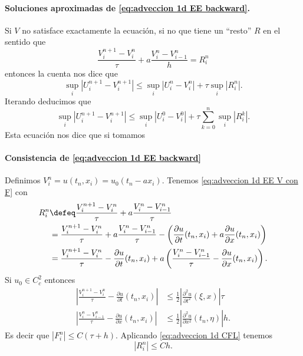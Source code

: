 \paragraph{Soluciones aproximadas de \eqref{eq:adveccion 1d EE backward}.}
Si $V$ no satisface exactamente la ecuación, si no que tiene un ``resto'' $R$ en el sentido que
\begin{equation}
    \label{eq:adveccion 1d EE V con F}
    \frac{V_i^{n+1} - V_i^n}{\tau} + a \frac{V_{i}^{n} - V_{i-1}^n}{h} = R_i^n
\end{equation}
entonces la cuenta nos dice que
\begin{equation*}
    \sup_i |U_i^{n+1} - V_i^{n+1}| \le \sup_i |U_i^n - V_i^n| + \tau \sup_i |R_i^{n}|.
\end{equation*}
Iterando deducimos que
\begin{equation}
    \tag{A-S}
    \label{eq:adveccion 1d dependencia continua}
    \sup_i |U_i^{n+1} - V_i^{n+1}| \le \sup_i |U_i^0 - V_i^0| + \tau \sum_{k=0}^n \sup_i |R_i^{k}|.
\end{equation}
Esta ecuación nos dice que si tomamos

\paragraph{Consistencia de \eqref{eq:adveccion 1d EE backward}}

Definimos $V_i^n = u(t_n, x_i) = u_0(t_n - ax_i)$.
Tenemos \eqref{eq:adveccion 1d EE V con F} con
\begin{align*}
    R_i^{n} & \defeq \frac{V_i^{n+1} - V_i^n}{\tau} + a \frac{V_i^{n} - V_{i-1}^n}{\tau}
    \\
            & = \frac{V_i^{n+1} - V_i^n}{\tau} + a \frac{V_i^{n} - V_{i-1}^n}{\tau} - \left( \frac{\partial u}{\partial t}(t_n, x_i) + a\frac{\partial u}{\partial x}(t_n, x_i)   \right)
    \\
            & = \frac{V_i^{n+1} - V_i^n}{\tau} - \frac{\partial u}{\partial t}(t_n, x_i) + a \left( \frac{V_i^{n} - V_{i-1}^n}{\tau} - \frac{\partial u}{\partial x}(t_n, x_i) \right).
\end{align*}
Si $u_0 \in C^2_c$ entonces
\begin{align*}
    \left|\frac{V_i^{n+1} - V_i^n}{\tau} - \frac{\partial u}{\partial t}(t_n, x_i) \right|
     & \le
    \frac 1 2 \left|\frac{\partial^2 u }{\partial t^2} (\xi, x)\right| \tau \\
    \left|\frac{V_i^{n} - V_{i-1}^n}{\tau} - \frac{\partial u}{\partial x}(t_n, x_i) \right|
     & \le
    \frac 1 2 \left|\frac{\partial^2 u }{\partial x^2} (t_n, \eta)\right| h .
\end{align*}
Es decir que $|F_{i}^n| \le C(\tau + h)$. Aplicando \eqref{eq:adveccion 1d CFL} tenemos
\begin{equation}
    \tag{A-C}
    \label{eq:adveccion 1d consistencia}
    |R_i^n| \le C h.
\end{equation}

